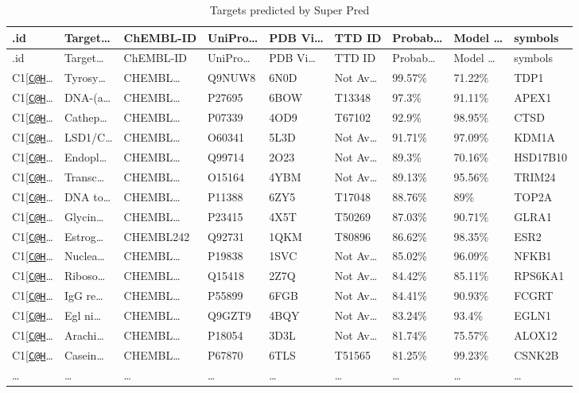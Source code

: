 \documentclass[
]{article}
\begin{document}
\begin{longtable}[]{@{}lllllllll@{}}
\caption{\label{tab:Targets-predicted-by-Super-Pred}Targets predicted by Super Pred}\tabularnewline
\toprule
.id & Target\ldots{} & ChEMBL-ID & UniPro\ldots{} & PDB Vi\ldots{} & TTD ID & Probab\ldots{} & Model \ldots{} & symbols\tabularnewline
\midrule
\endfirsthead
\toprule
.id & Target\ldots{} & ChEMBL-ID & UniPro\ldots{} & PDB Vi\ldots{} & TTD ID & Probab\ldots{} & Model \ldots{} & symbols\tabularnewline
\midrule
\endhead
C1{[}\href{mailto:C@H}{\nolinkurl{C@H}}\ldots{} & Tyrosy\ldots{} & CHEMBL\ldots{} & Q9NUW8 & 6N0D & Not Av\ldots{} & 99.57\% & 71.22\% & TDP1\tabularnewline
C1{[}\href{mailto:C@H}{\nolinkurl{C@H}}\ldots{} & DNA-(a\ldots{} & CHEMBL\ldots{} & P27695 & 6BOW & T13348 & 97.3\% & 91.11\% & APEX1\tabularnewline
C1{[}\href{mailto:C@H}{\nolinkurl{C@H}}\ldots{} & Cathep\ldots{} & CHEMBL\ldots{} & P07339 & 4OD9 & T67102 & 92.9\% & 98.95\% & CTSD\tabularnewline
C1{[}\href{mailto:C@H}{\nolinkurl{C@H}}\ldots{} & LSD1/C\ldots{} & CHEMBL\ldots{} & O60341 & 5L3D & Not Av\ldots{} & 91.71\% & 97.09\% & KDM1A\tabularnewline
C1{[}\href{mailto:C@H}{\nolinkurl{C@H}}\ldots{} & Endopl\ldots{} & CHEMBL\ldots{} & Q99714 & 2O23 & Not Av\ldots{} & 89.3\% & 70.16\% & HSD17B10\tabularnewline
C1{[}\href{mailto:C@H}{\nolinkurl{C@H}}\ldots{} & Transc\ldots{} & CHEMBL\ldots{} & O15164 & 4YBM & Not Av\ldots{} & 89.13\% & 95.56\% & TRIM24\tabularnewline
C1{[}\href{mailto:C@H}{\nolinkurl{C@H}}\ldots{} & DNA to\ldots{} & CHEMBL\ldots{} & P11388 & 6ZY5 & T17048 & 88.76\% & 89\% & TOP2A\tabularnewline
C1{[}\href{mailto:C@H}{\nolinkurl{C@H}}\ldots{} & Glycin\ldots{} & CHEMBL\ldots{} & P23415 & 4X5T & T50269 & 87.03\% & 90.71\% & GLRA1\tabularnewline
C1{[}\href{mailto:C@H}{\nolinkurl{C@H}}\ldots{} & Estrog\ldots{} & CHEMBL242 & Q92731 & 1QKM & T80896 & 86.62\% & 98.35\% & ESR2\tabularnewline
C1{[}\href{mailto:C@H}{\nolinkurl{C@H}}\ldots{} & Nuclea\ldots{} & CHEMBL\ldots{} & P19838 & 1SVC & Not Av\ldots{} & 85.02\% & 96.09\% & NFKB1\tabularnewline
C1{[}\href{mailto:C@H}{\nolinkurl{C@H}}\ldots{} & Riboso\ldots{} & CHEMBL\ldots{} & Q15418 & 2Z7Q & Not Av\ldots{} & 84.42\% & 85.11\% & RPS6KA1\tabularnewline
C1{[}\href{mailto:C@H}{\nolinkurl{C@H}}\ldots{} & IgG re\ldots{} & CHEMBL\ldots{} & P55899 & 6FGB & Not Av\ldots{} & 84.41\% & 90.93\% & FCGRT\tabularnewline
C1{[}\href{mailto:C@H}{\nolinkurl{C@H}}\ldots{} & Egl ni\ldots{} & CHEMBL\ldots{} & Q9GZT9 & 4BQY & Not Av\ldots{} & 83.24\% & 93.4\% & EGLN1\tabularnewline
C1{[}\href{mailto:C@H}{\nolinkurl{C@H}}\ldots{} & Arachi\ldots{} & CHEMBL\ldots{} & P18054 & 3D3L & Not Av\ldots{} & 81.74\% & 75.57\% & ALOX12\tabularnewline
C1{[}\href{mailto:C@H}{\nolinkurl{C@H}}\ldots{} & Casein\ldots{} & CHEMBL\ldots{} & P67870 & 6TLS & T51565 & 81.25\% & 99.23\% & CSNK2B\tabularnewline
\ldots{} & \ldots{} & \ldots{} & \ldots{} & \ldots{} & \ldots{} & \ldots{} & \ldots{} & \ldots{}\tabularnewline
\bottomrule
\end{longtable}
\end{document}
